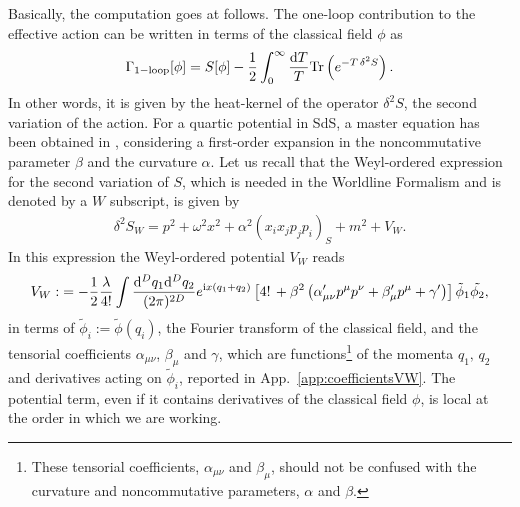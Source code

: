 \documentclass[a4paper,10pt]{amsart}
\begin{document}
Basically, the computation goes at follows. The one-loop contribution to the effective action can be written in terms of the classical field $\phi$ as
\begin{align}
\Gamma_{1-\text{loop}}[\phi] = S[\phi]-\frac{1}{2} \int_{0}^{\infty}\frac{{\rm d}T }{T}\text{Tr} \left( e^{-T \,\delta^2 S}\right).
\end{align}
In other words, it is given by the heat-kernel of the operator $\delta^2 S$, the second variation of the action.
For a quartic potential in SdS, a master equation has been obtained in \cite{Franchino-Vinas:2019nqy}, considering a first-order expansion in the noncommutative parameter $\beta$ and the curvature $\alpha$. Let us recall that the Weyl-ordered expression for the second variation of $S$, which is needed in the Worldline Formalism  \cite{Bastianelli:1992ct} and is denoted by a $W$ subscript, is given by
\begin{align}\label{eq:variation_SW}
 \delta^2 S_{W}=p^2+\omega^2x^2
 +\alpha^2 (x_ix_jp_jp_i)_S+m^2+V_W.
\end{align}
In this expression the  Weyl-ordered potential $V_W$ reads
\begin{align}\label{eq:VW}
\begin{split}
 V_{W}:&=-\frac{1}{2}\frac{\lambda}{4!}\int  \frac{{\rm d}^D q_1 {\rm d}^Dq_2}{(2\pi)^{2D}} e^{ {\rm i} x ( q_1+q_2)} \left[4!\,  +\beta^2 \left(\alpha_{\mu\nu}' p^{\mu} p^{\nu}+\beta_{\mu}' p^{\mu}+\gamma'\right)\right] \tilde{\phi}_{1}\tilde{\phi_2},\\
 \end{split}
\end{align}
in terms of $\tilde \phi_i:=\tilde\phi(q_i)$, the Fourier transform of the classical field, and the tensorial coefficients $\alpha_{\mu\nu}$, $\beta_{\mu}$ and $\gamma$, which are functions\footnote{These tensorial coefficients, $\alpha_{\mu\nu}$ and $\beta_{\mu}$, should not be confused with the curvature and noncommutative parameters, $\alpha$ and $\beta$.} of the momenta $q_1,\,q_2$ and derivatives acting on $\tilde\phi_i$, reported in  App.~\ref{app:coefficientsVW}.
The potential term, even if it contains derivatives of the classical field $\phi$, is local at the order in  which we are working.
\end{document}
